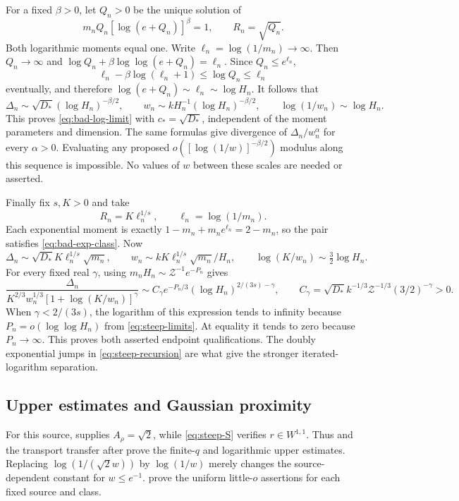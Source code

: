 \documentclass[11pt]{article}
\numberwithin{equation}{section}
\theoremstyle{remark}\newtheorem{remark}[theorem]{Remark}
\begin{document}
For a fixed $\beta>0$, let $Q_n>0$ be the unique solution of
\begin{equation}\label{eq:steep-log-radius}
 m_nQ_n[\log(e+Q_n)]^\beta=1,\qquad R_n=\sqrt{Q_n}.
\end{equation}
Both logarithmic moments equal one. Write $\ell_n=\log(1/m_n)\to\infty$. Then $Q_n\to\infty$ and
$\log Q_n+\beta\log\log(e+Q_n)=\ell_n$. Since $Q_n\le e^{\ell_n}$,
\[
 \ell_n-\beta\log(\ell_n+1)\le\log Q_n\le\ell_n
\]
eventually, and therefore $\log(e+Q_n)\sim\ell_n\sim\log H_n$.
It follows that
\[
 \Delta_n\sim\sqrt{D_*}(\log H_n)^{-\beta/2},\qquad
 w_n\sim kH_n^{-1}(\log H_n)^{-\beta/2},\qquad
 \log(1/w_n)\sim\log H_n.
\]
This proves \eqref{eq:bad-log-limit} with $c_*=\sqrt{D_*}$, independent of the moment parameters and dimension. The same formulas give divergence of $\Delta_n/w_n^\alpha$ for every $\alpha>0$. Evaluating any proposed $o([\log(1/w)]^{-\beta/2})$ modulus along this sequence is impossible. No values of $w$ between these scales are needed or asserted.

Finally fix $s,K>0$ and take
\begin{equation}\label{eq:steep-exp-radius}
 R_n=K\ell_n^{1/s},\qquad\ell_n=\log(1/m_n).
\end{equation}
Each exponential moment is exactly $1-m_n+m_ne^{\ell_n}=2-m_n$, so the pair satisfies \eqref{eq:bad-exp-class}. Now
\[
 \Delta_n\sim\sqrt{D_*}K\ell_n^{1/s}\sqrt{m_n},\qquad
 w_n\sim kK\ell_n^{1/s}\sqrt{m_n}/H_n,\qquad
 \log(K/w_n)\sim\tfrac32\log H_n.
\]
For every fixed real $\gamma$, using $m_nH_n\sim\mathcal Z^{-1}e^{-P_n}$ gives
\begin{equation}\label{eq:steep-exp-ratio}
 \frac{\Delta_n}{K^{2/3}w_n^{1/3}[1+\log(K/w_n)]^\gamma}
 \sim C_\gamma e^{-P_n/3}(\log H_n)^{2/(3s)-\gamma},\qquad
 C_\gamma=\sqrt{D_*}k^{-1/3}\mathcal Z^{-1/3}(3/2)^{-\gamma}>0.
\end{equation}
When $\gamma<2/(3s)$, the logarithm of this expression tends to infinity because $P_n=o(\log\log H_n)$ from \eqref{eq:steep-limits}. At equality it tends to zero because $P_n\to\infty$. This proves both asserted endpoint qualifications. The doubly exponential jumps in \eqref{eq:steep-recursion} are what give the stronger iterated-logarithm separation.

\subsection{Upper estimates and Gaussian proximity}
For this source,  supplies $A_\rho=\sqrt2$, while \eqref{eq:steep-S} verifies $r\in W^{1,1}$. Thus  and the transport transfer after  prove the finite-$q$ and logarithmic upper estimates. Replacing $\log(1/(\sqrt2w))$ by $\log(1/w)$ merely changes the source-dependent constant for $w\le e^{-1}$.  prove the uniform little-$o$ assertions for each fixed source and class.
\end{document}
